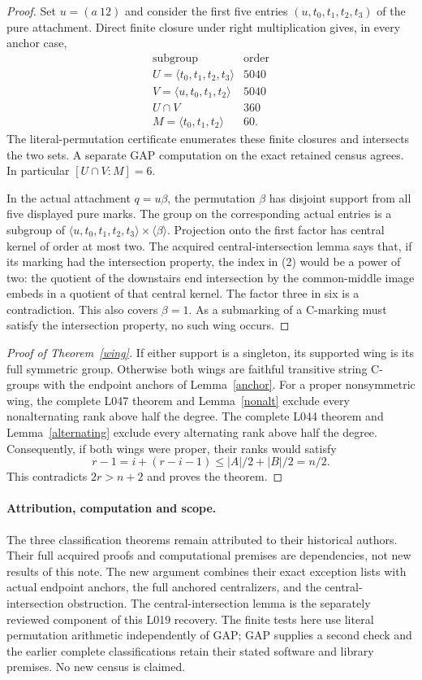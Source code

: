 \documentclass[11pt,a4paper]{article}
\newcommand{\gen}[1]{\langle#1\rangle}
\begin{document}
\begin{proof}
Set $u=(a\ 12)$ and consider the first five entries
$(u,t_0,t_1,t_2,t_3)$ of the pure attachment. Direct finite closure
under right multiplication gives, in every anchor case,
\[
\begin{array}{c|c}
\text{subgroup}&\text{order}\\ \hline
 U=\gen{t_0,t_1,t_2,t_3}&5040\\
 V=\gen{u,t_0,t_1,t_2}&5040\\
 U\cap V&360\\
 M=\gen{t_0,t_1,t_2}&60.
\end{array}                                                   \tag{2}
\]
The literal-permutation certificate enumerates these finite
closures and intersects the two sets. A separate GAP computation
on the exact retained census agrees. In particular
$[U\cap V:M]=6$.

In the actual attachment $q=u\beta$, the permutation $\beta$
has disjoint support from all five displayed pure marks. The
group on the corresponding actual entries is a subgroup of
$\gen{u,t_0,t_1,t_2,t_3}\times\gen\beta$. Projection onto the
first factor has central kernel of order at most two. The
acquired central-intersection lemma says that, if its marking
had the intersection property, the index in (2) would be a
power of two: the quotient of the downstairs end intersection
by the common-middle image embeds in a quotient of that central
kernel. The factor three in six is a contradiction. This also
covers $\beta=1$. As a submarking of a C-marking must satisfy
the intersection property, no such wing occurs.
\end{proof}

\begin{proof}[Proof of Theorem~\ref{wing}]
If either support is a singleton, its supported wing is its full
symmetric group. Otherwise both wings are faithful transitive
string C-groups with the endpoint anchors of Lemma~\ref{anchor}.
For a proper nonsymmetric wing, the complete L047 theorem and
Lemma~\ref{nonalt} exclude every nonalternating rank above half
the degree. The complete L044 theorem and
Lemma~\ref{alternating} exclude every alternating rank above half
the degree. Consequently, if both wings were proper, their ranks
would satisfy
\[
 r-1=i+(r-i-1)\le |A|/2+|B|/2=n/2.
\]
This contradicts $2r>n+2$ and proves the theorem.
\end{proof}

\paragraph{Attribution, computation and scope.}
The three classification theorems remain attributed to their
historical authors. Their full acquired proofs and computational
premises are dependencies, not new results of this note. The new
argument combines their exact exception lists with actual endpoint
anchors, the full anchored centralizers, and the central-intersection
obstruction. The central-intersection lemma is the separately reviewed
component of this L019 recovery. The finite tests here use literal
permutation arithmetic independently of GAP; GAP supplies a second
check and the earlier complete classifications retain their stated
software and library premises. No new census is claimed.
\end{document}
